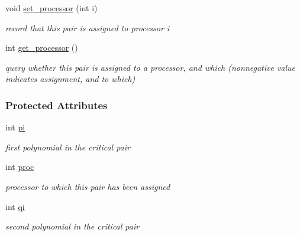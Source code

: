 \begin{Indent}
\begin{DoxyCompactItemize}
void \hyperlink{group___g_b_computation_a4c0085660583e247f354735ee900f2d3}{set\+\_\+processor} (int i)
\begin{DoxyCompactList}\small\item\em record that this pair is assigned to processor {\ttfamily i} \end{DoxyCompactList}\item 
\mbox{\label{group___g_b_computation_a1f07b8a991c138ad6c8de5deeb64ece6}} 
int \hyperlink{group___g_b_computation_a1f07b8a991c138ad6c8de5deeb64ece6}{get\+\_\+processor} ()
\begin{DoxyCompactList}\small\item\em query whether this pair is assigned to a processor, and which (nonnegative value indicates assignment, and to which) \end{DoxyCompactList}\end{DoxyCompactItemize}
\end{Indent}
\subsubsection*{Protected Attributes}
\begin{DoxyCompactItemize}
\item 
\mbox{\label{group___g_b_computation_a815645cd7956540b6980868654e149a3}} 
int \hyperlink{group___g_b_computation_a815645cd7956540b6980868654e149a3}{pi}
\begin{DoxyCompactList}\small\item\em first polynomial in the critical pair \end{DoxyCompactList}\item 
\mbox{\label{group___g_b_computation_a4e0a3c515ad3d9e29cec832d95ab2caa}} 
int \hyperlink{group___g_b_computation_a4e0a3c515ad3d9e29cec832d95ab2caa}{proc}
\begin{DoxyCompactList}\small\item\em processor to which this pair has been assigned \end{DoxyCompactList}\item 
\mbox{\label{group___g_b_computation_a14a644d6decf4147a78dbaa85612130a}} 
int \hyperlink{group___g_b_computation_a14a644d6decf4147a78dbaa85612130a}{qi}
\begin{DoxyCompactList}\small\item\em second polynomial in the critical pair \end{DoxyCompactList}\end{DoxyCompactItemize}
\label{class_f4___reduction___data}
